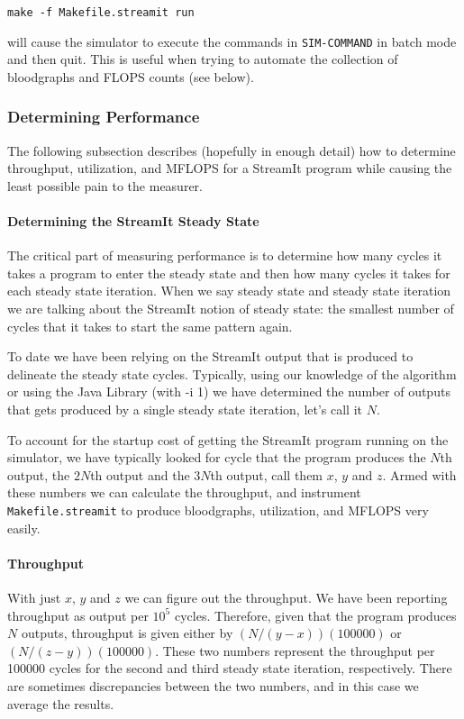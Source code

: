 \begin{verbatim}make -f Makefile.streamit run\end{verbatim}

will cause the simulator to execute the commands in \texttt{SIM-COMMAND}
in batch mode and then quit. This is useful when trying to automate
the collection of bloodgraphs and FLOPS counts (see below).






\subsubsection{Determining Performance}
The following subsection describes (hopefully in enough detail) how
to determine throughput, utilization, and MFLOPS for a StreamIt program
while causing the least possible pain to the measurer.

\paragraph{Determining the StreamIt Steady State}
The critical part of measuring performance is to determine how many cycles
it takes a program to enter the steady state and then how many cycles
it takes for each steady state iteration. When we say steady state and steady
state iteration we are talking about the StreamIt notion of steady state: the
smallest number of cycles that it takes to start the same pattern again.

To date we have been relying on the StreamIt output that is produced 
to delineate the steady state cycles. Typically, using our knowledge of
the algorithm or using the Java Library (with -i 1) we have determined the
number of outputs that gets produced by a single steady state iteration, let's call
it $N$.

To account for the startup cost of getting the StreamIt program running on
the simulator, we have typically looked for cycle that the program produces
the $N$th output, the $2N$th output and the $3N$th output, call them $x$, $y$ and $z$. 
Armed with these numbers we can calculate the throughput, and instrument
\texttt{Makefile.streamit} to produce bloodgraphs, utilization, and MFLOPS very easily. 

\paragraph{Throughput} 
With just $x$, $y$ and $z$ we can figure out the throughput. We have been reporting
throughput as output per $10^5$ cycles. Therefore, given that the program produces
$N$ outputs, throughput is given either by $(N/(y-x))(100000)$ or $(N/(z-y))(100000)$.
These two numbers represent the throughput per 100000 cycles for the second and third
steady state iteration, respectively. There are sometimes discrepancies between the two 
numbers, and in this case we average the results.

